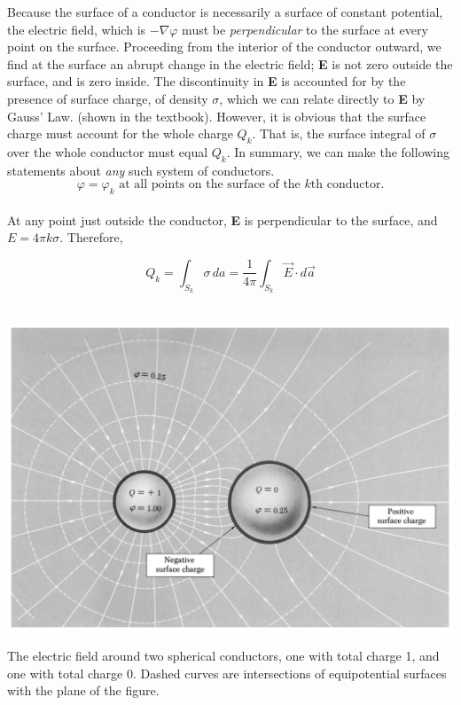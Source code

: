 \documentclass[svgnames]{article}
\begin{document}
Because the surface of a conductor is necessarily a surface of constant
potential, the electric field, which is $-\nabla \varphi$ must be
\textit{perpendicular} to the surface at every point on the surface. Proceeding
from the interior of the conductor outward, we find at the surface an abrupt
change in the electric field;  \textbf{E} is not zero outside the surface, and
is zero inside. The discontinuity in \textbf{E} is accounted for by the
presence of surface charge, of density $\sigma$, which we can relate directly
to  \textbf{E} by Gauss' Law. (shown in the textbook). However, it is obvious
that the surface charge must account for the whole charge $Q_k$. That is, the
surface integral of $\sigma$ over the whole conductor must equal $Q_k$. In
summary, we can make the following statements about \textit{any} such system of
conductors. \\\[
\varphi = \varphi_k \text{ at all points on the surface of the $k$th conductor}
.\]\\ 

At any point just outside the conductor, \textbf{E} is perpendicular to the
surface, and $E = 4\pi k \sigma$. Therefore, 

\[
  Q_k = \int_{S_k} \sigma \, da = \frac{1}{4\pi} \int_{S_k} \vec{E} \cdot
  d\vec{a} 
\]\\
\begin{center}
\includegraphics[width = 15cm]{screenshot 7.png}
\end{center}

The electric field around two spherical conductors, one with total charge 1,
and one with total charge 0. Dashed curves are intersections of equipotential
surfaces with the plane of the figure. 
\end{document}
